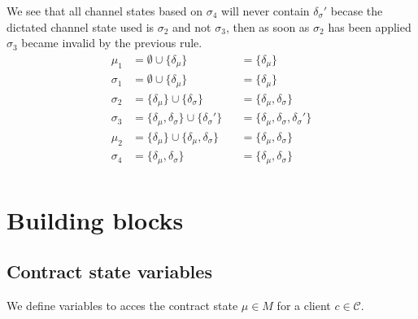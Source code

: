 \documentclass{llncs}
\begin{document}
We see that all channel states based on $\sigma_4$ will never contain $\delta_\sigma'$ becase the dictated channel state used is $\sigma_2$ and not $\sigma_3$, then as soon as $\sigma_2$ has been applied $\sigma_3$ became invalid by the previous rule.
\begin{align*}
    \mu_1    &= \emptyset \cup \{\delta_\mu\} & &= \{\delta_\mu\} \\
    \sigma_1 &= \emptyset \cup \{\delta_\mu\} & &= \{\delta_\mu\} \\
    \sigma_2 &= \{\delta_\mu\} \cup \{\delta_\sigma\} & &= \{\delta_\mu,\delta_\sigma\} \\
    \sigma_3 &= \{\delta_\mu,\delta_\sigma\}\cup\{\delta_\sigma'\} & &= \{\delta_\mu,\delta_\sigma,\delta_\sigma'\} \\
    \mu_2    &= \{\delta_\mu\} \cup \{\delta_\mu,\delta_\sigma\} & &= \{\delta_\mu,\delta_\sigma\} \\
    \sigma_4 &=  \{\delta_\mu,\delta_\sigma\} & &= \{\delta_\mu,\delta_\sigma\} \\
\end{align*}

%
%

\section{Building blocks}
\subsection{Contract state variables} We define variables to acces the contract state $\mu \in M$ for a client $c \in \mathcal{C}$.
\end{document}
